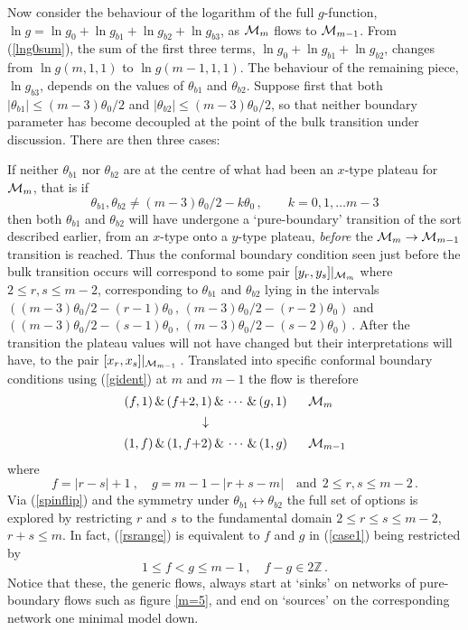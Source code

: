 \documentclass[11pt]{article}
\newcommand\ZZ{{\mathbb Z}}
\newcommand\phup{^{\phantom o}}
\newcommand{\CM}{{\cal M}}
\newcommand\beq{\begin{equation}}
\newcommand\eeq{\end{equation}}
\newcommand{\tbi}{\theta_{b1}}
\newcommand{\tbii}{\theta_{b2}}
\newcommand{\tz}{\theta_0}
\newcommand{\go}{g\phup_{0}}
\newcommand{\gi}{g\phup_{b1}}
\newcommand{\gii}{g\phup_{b2}}
\newcommand{\giii}{g\phup_{b3}}
\begin{document}
Now consider the behaviour of the logarithm of the full
$g$-function, $\ln g=\ln\go+\ln\gi+\ln\gii+\ln\giii$, as $\CM_m$ flows
to $\CM_{m-1}$. From 
(\ref{lng0sum}), the sum of the first three terms,
$\ln\go+\ln\gi+\ln\gii$, changes from $\ln g(m,1,1)$ to $\ln
g(m{-}1,1,1)$. The behaviour of the remaining piece, $\ln\giii$,
depends on the values of $\tbi$ and $\tbii$. Suppose first that
both $|\tbi|\le (m{-}3)\tz/2$ and 
$|\tbii|\le (m{-}3)\tz/2$, so that neither boundary parameter has 
become decoupled at the point of the bulk transition under discussion. 
There are then three cases:

\smallskip

If neither $\tbi$ nor $\tbii$ are at the centre of
what had been an $x$-type plateau for $\CM_m$, that is if
\beq
\tbi, \tbii \neq (m{-}3)\tz/2-k\tz\,,\qquad k=0,1,\dots m-3
\eeq
then both $\tbi$ and $\tbii$ will have undergone a
`pure-boundary' transition of the sort described earlier, from an
$x$-type onto a $y$-type plateau,
{\em before}\/ the $\CM_m\to\CM_{m-1}$ transition is
reached. Thus the conformal boundary condition seen just before
the bulk transition occurs will correspond to some pair
$[y_r,y_s]|_{\CM_m}$ where $2\le r,s\le m{-}2$, corresponding to
$\tbi$ and $\tbii$ lying in the intervals
$((m{-}3)\tz/2{-}(r{-}1)\tz\,,\,(m{-}3)\tz/2{-}(r{-}2)\tz)$ and
$((m{-}3)\tz/2{-}(s{-}1)\tz\,,\,(m{-}3)\tz/2{-}(s{-}2)\tz)$\,.
After the transition the plateau values will
not have changed but their interpretations will have, to the pair
$[x_r,x_s]|_{\CM_{m-1}}$\,. Translated into specific conformal
boundary conditions using (\ref{gident}) at $m$ and $m-1$ the flow
is therefore
\beq
\begin{array}{cl}
(f,1)\,\&\,
(f{+}2,1)\,\&\,
\cdots\,\&\,
(g,1) & ~~\CM_m\\[4pt]
\downarrow & \\[5pt]
(1,f)\,\&\,
(1,f{+}2)\,\&\,
\cdots\,\&\,
(1,g) & ~~\CM_{m-1}
\end{array}
\label{case1}
\eeq
where
\beq
f=|r{-}s|{+}1~,\quad g=m{-}1{-}|r{+}s{-}m|
\quad \mbox{and}~~ 2\le r,s \le m{-}2\,.
\label{rsrange}
\eeq
Via (\ref{spinflip}) and the symmetry under $\tbi\leftrightarrow\tbii$ 
the full set of options is explored by restricting $r$ and $s$ to the
fundamental domain $2\le r\le s\le m-2$, $r+s\le m$. In fact,
(\ref{rsrange}) is equivalent to $f$ and $g$ in (\ref{case1})
being restricted by
\beq
1\le f<g\le m-1\,,\quad f-g\in 2\ZZ\,.
\eeq
Notice that these, the generic flows, always start at `sinks'
on networks of pure-boundary flows such as figure \ref{m=5}, and end
on `sources' on the corresponding network one minimal model down.
\end{document}

